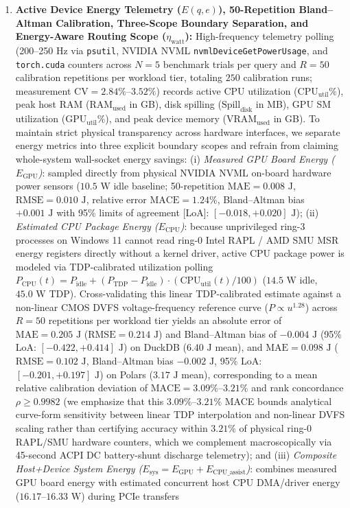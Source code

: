 \documentclass[10pt,a4paper]{article}
\begin{document}
\begin{enumerate}[leftmargin=1.5em,itemsep=3pt]
\begin{equation}
    \end{equation}
    \item \textbf{Active Device Energy Telemetry ($E(q,e)$), 50-Repetition Bland--Altman Calibration, Three-Scope Boundary Separation, and Energy-Aware Routing Scope ($\eta_{\text{watt}}$):} High-frequency telemetry polling (200--250 Hz via \texttt{psutil}, NVIDIA NVML \texttt{nvmlDeviceGetPowerUsage}, and \texttt{torch.cuda} counters across $N=5$ benchmark trials per query and $R=50$ calibration repetitions per workload tier, totaling $250$ calibration runs; measurement $\text{CV} = 2.84\%\text{--}3.52\%$) records active CPU utilization ($\text{CPU}_{\text{util}}\%$), peak host RAM ($\text{RAM}_{\text{used}}$ in GB), disk spilling ($\text{Spill}_{\text{disk}}$ in MB), GPU SM utilization ($\text{GPU}_{\text{util}}\%$), and peak device memory ($\text{VRAM}_{\text{used}}$ in GB). To maintain strict physical transparency across hardware interfaces, we separate energy metrics into three explicit boundary scopes and refrain from claiming whole-system wall-socket energy savings: (i) \emph{Measured GPU Board Energy ($E_{\text{GPU}}$)}: sampled directly from physical NVIDIA NVML on-board hardware power sensors ($10.5\text{ W}$ idle baseline; 50-repetition $\text{MAE} = 0.008\text{ J}$, $\text{RMSE} = 0.010\text{ J}$, relative error $\text{MACE} = 1.24\%$, Bland--Altman bias $+0.001\text{ J}$ with 95\% limits of agreement [LoA]: $[-0.018, +0.020]\text{ J}$); (ii) \emph{Estimated CPU Package Energy ($E_{\text{CPU}}$)}: because unprivileged ring-3 processes on Windows 11 cannot read ring-0 Intel RAPL / AMD SMU MSR energy registers directly without a kernel driver, active CPU package power is modeled via TDP-calibrated utilization polling $P_{\text{CPU}}(t) = P_{\text{idle}} + (P_{\text{TDP}} - P_{\text{idle}})\cdot(\text{CPU}_{\text{util}}(t)/100)$ ($14.5\text{ W}$ idle, $45.0\text{ W}$ TDP). Cross-validating this linear TDP-calibrated estimate against a non-linear CMOS DVFS voltage-frequency reference curve ($P \propto u^{1.28}$) across $R=50$ repetitions per workload tier yields an absolute error of $\text{MAE} = 0.205\text{ J}$ ($\text{RMSE} = 0.214\text{ J}$) and Bland--Altman bias of $-0.004\text{ J}$ (95\% LoA: $[-0.422, +0.414]\text{ J}$) on DuckDB ($6.40\text{ J}$ mean), and $\text{MAE} = 0.098\text{ J}$ ($\text{RMSE} = 0.102\text{ J}$, Bland--Altman bias $-0.002\text{ J}$, 95\% LoA: $[-0.201, +0.197]\text{ J}$) on Polars ($3.17\text{ J}$ mean), corresponding to a mean relative calibration deviation of $\text{MACE} = 3.09\%\text{--}3.21\%$ and rank concordance $\rho \ge 0.9982$ (we emphasize that this $3.09\%\text{--}3.21\%$ MACE bounds analytical curve-form sensitivity between linear TDP interpolation and non-linear DVFS scaling rather than certifying accuracy within $3.21\%$ of physical ring-0 RAPL/SMU hardware counters, which we complement macroscopically via 45-second ACPI DC battery-shunt discharge telemetry); and (iii) \emph{Composite Host+Device System Energy ($E_{\text{sys}} = E_{\text{GPU}} + E_{\text{CPU\_assist}}$)}: combines measured GPU board energy with estimated concurrent host CPU DMA/driver energy ($16.17\text{--}16.33\text{ W}$) during PCIe transfers 
\end{enumerate}
\end{document}
